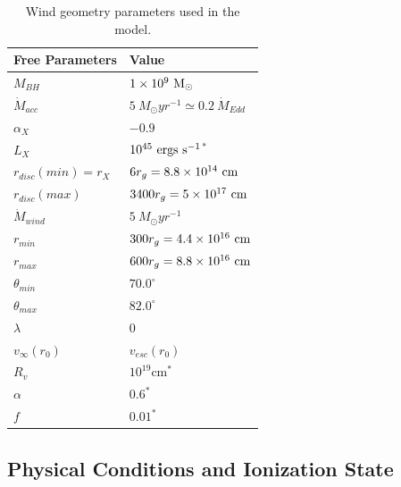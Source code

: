 \documentclass[preprint, a4paper, 11pt]{aastex}
\begin{document}
\begin{table}
\begin{tabular}{p{3cm}p{4cm}}
\hline Free Parameters 	&	 Value \\ 
\hline \hline 
$M_{BH}$ 	 &	 $1\times 10^9~\rm{M_{\odot}}$ \\ 
$\dot{M}_{acc}$ 	 &	 $5~M_{\odot}yr^{-1} \simeq 0.2~\dot{M}_{Edd}$\\ 
$\alpha_X$ 	 &	 $-0.9$ \\ 
$L_{X} $ 	 &	 $10^{45}~\rm{ergs~s^{-1}}$$^*$ \\ 
$r_{disc}(min)=r_{X}$   &	 $6r_g=8.8\times10^{14}~{\rm cm}$ \\ 
$r_{disc}(max)$   &	 $3400r_g = 5\times10^{17}~{\rm cm}$ \\ 
$\dot{M}_{wind}$  &	 $5~M_{\odot}yr^{-1}$ \\ 
$r_{min}$ 	&	 $300r_{g} = 4.4\times10^{16}~{\rm cm}$\\ 
$r_{max}$ 	&	 $600r_{g} = 8.8\times10^{16}~{\rm cm}$ \\ 
$\theta_{min}$ 	&	 $70.0^{\circ}$ \\ 
$\theta_{max}$ 	&	 $82.0^{\circ}$ \\ 
$\lambda$ 	&	 $0$ \\ 
$v_{\infty}(r_0)$ 	&	 $v_{esc}(r_0)$ \\ 
$R_v$  	        &	 $10^{19}$cm$^*$ \\ 
$\alpha$ 	&	 $0.6^*$ \\
$f$ 	&	 $0.01^*$  \\
\hline 
\end{tabular}
\caption{Wind geometry parameters used in the model.}
\label{wind_param}
\end{table}



\subsection{Physical Conditions and Ionization State}
\end{document}

